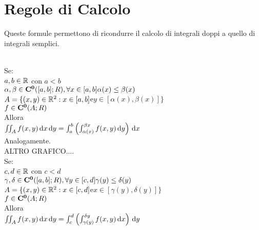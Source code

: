 \section{Regole di Calcolo}
Queste formule permettono di ricondurre il calcolo di integrali doppi a quello di integrali semplici.\\
\\
Se:\\
$a,b\in \mathbb{R}$ con $a<b$\\
$\alpha,\beta\in \mathbf{C^{0}}([a,b];R), \forall x\in[a,b] \alpha(x)\le\beta(x)$\\
$A=\{(x,y)\in \mathbb{R}^2: x\in [a,b] $e$ y\in [\alpha(x),\beta(x)] \}$\\
$f\in \mathbf{C^{0}}(A;R)$\\
Allora\\
$\iint_Af(x,y)\,\mathrm{d}{x}\,\mathrm{d}{y}=\int_a^b\left(\int_{\alpha(x)}^{\beta{x}}f(x,y)\,\mathrm{d}{y}\right)\,\mathrm{d}{x}$\\
Analogamente.\\
ALTRO GRAFICO....\\
Se:\\
$c,d\in \mathbb{R}$ con $c<d$\\
$\gamma,\delta\in \mathbf{C^{0}}([a,b];R), \forall y\in[c,d] \gamma(y)\le\delta(y)$\\
$A=\{(x,y)\in \mathbb{R}^2: x\in [c,d] $e$ x\in [\gamma(y),\delta(y)] \}$\\
$f\in \mathbf{C^{0}}(A;R)$\\
Allora\\
$\iint_Af(x,y)\,\mathrm{d}{x}\,\mathrm{d}{y}=\int_c^d\left(\int_{\gamma(y)}^{\delta{y}}f(x,y)\,\mathrm{d}{x}\right)\,\mathrm{d}{y}$

